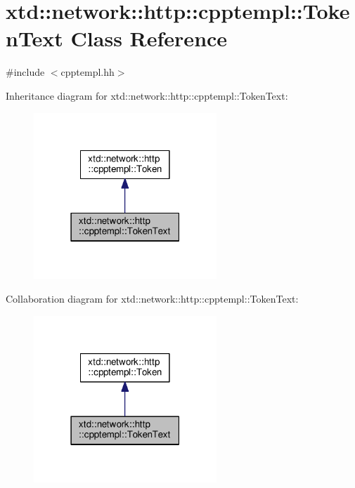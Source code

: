 \hypertarget{classxtd_1_1network_1_1http_1_1cpptempl_1_1TokenText}{}\section{xtd\+:\+:network\+:\+:http\+:\+:cpptempl\+:\+:Token\+Text Class Reference}
\label{classxtd_1_1network_1_1http_1_1cpptempl_1_1TokenText}


{\ttfamily \#include $<$cpptempl.\+hh$>$}



Inheritance diagram for xtd\+:\+:network\+:\+:http\+:\+:cpptempl\+:\+:Token\+Text\+:
\nopagebreak
\begin{figure}[H]
\begin{center}
\leavevmode
\includegraphics[width=195pt]{classxtd_1_1network_1_1http_1_1cpptempl_1_1TokenText__inherit__graph}
\end{center}
\end{figure}


Collaboration diagram for xtd\+:\+:network\+:\+:http\+:\+:cpptempl\+:\+:Token\+Text\+:
\nopagebreak
\begin{figure}[H]
\begin{center}
\leavevmode
\includegraphics[width=195pt]{classxtd_1_1network_1_1http_1_1cpptempl_1_1TokenText__coll__graph}
\end{center}
\end{figure}
